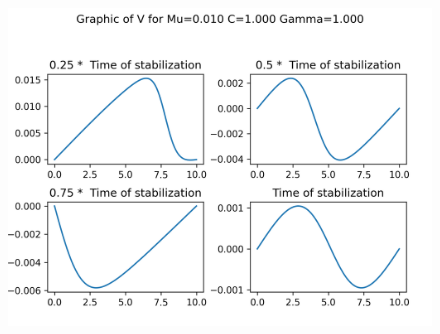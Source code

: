 \begin{figure}[H]
	\includegraphics[scale=0.5]{../graphs_data_nonsmooth_2/slices/Graph_V_mu0.010_C1.000_gamma1.000.png}
\end{figure}

